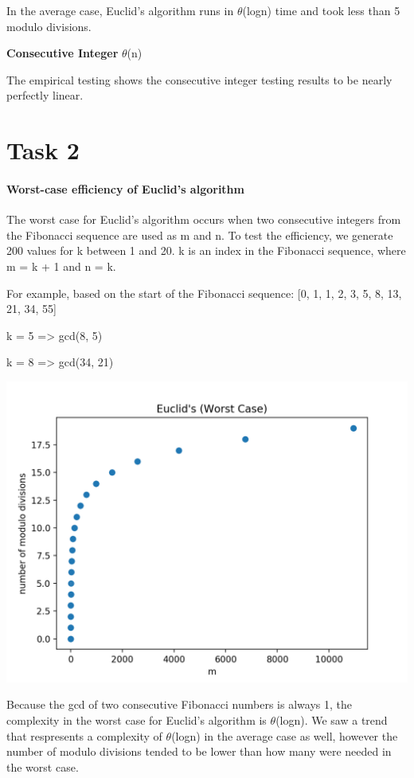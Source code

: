 \documentclass{report}
\begin{document}
\begin{flushleft}
		In the average case, Euclid's algorithm runs in $\theta$(logn) time and took less than 
		5 modulo divisions.
		
		\textbf{Consecutive Integer} $\theta$(n)

		The empirical testing shows the consecutive integer testing results to be nearly perfectly linear.

		\section{Task 2}

		\paragraph{Worst-case efficiency of Euclid's algorithm}
		The worst case for Euclid's algorithm occurs when two consecutive integers from the Fibonacci sequence are used as m and n. To test
		the efficiency, we generate 200 values for k between 1 and 20. k is an index in the Fibonacci sequence, where m = k + 1 and n = k.

		For example, based on the start of the Fibonacci sequence: [0, 1, 1, 2, 3, 5, 8, 13, 21, 34, 55]

		k = 5 => gcd(8, 5)

		k = 8 => gcd(34, 21)

		\includegraphics{task2}

		Because the gcd of two consecutive Fibonacci numbers is always 1, the complexity in the worst case for Euclid's algorithm
		is $\theta$(logn). We saw a trend that respresents a complexity of $\theta$(logn) in the average case as well, however the number
		of modulo divisions tended to be lower than how many were needed in the worst case.


\end{flushleft}
\end{document}

